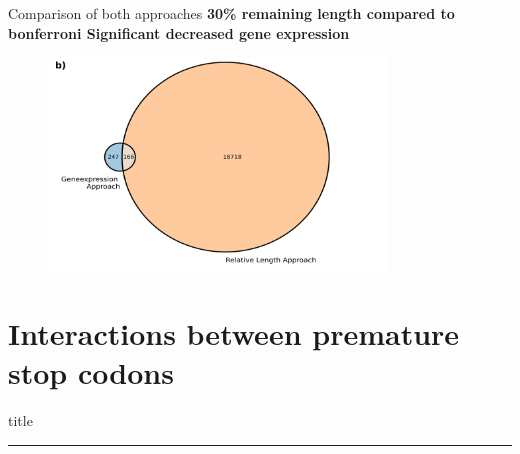 \documentclass{beamer}
\begin{document}
\begin{frame}{Comparison of both approaches}
	\textbf{30\% remaining length compared to bonferroni Significant decreased gene expression}
	
	\vspace{3mm}
	 
	\begin{figure}[tb]
		\centering
		\begin{minipage}[h]{1\textwidth}
		\centering
		\includegraphics[width=0.8\textwidth]{images/Venn_Diagramm_big.png}
		\label{fig:Venn_Diagramm_big}
		\end{minipage}
	\end{figure}
\end{frame}
\section{Interactions between premature stop codons}
\begin{frame}[plain]
    \vfill
    \centering
    \begin{beamercolorbox}[sep=8pt,center,shadow=true,rounded=true]{title}
      \insertsectionhead\par%
      \noindent\rule{10cm}{1pt} \\
    \end{beamercolorbox}
    \vfill
\end{frame}
\end{document}
